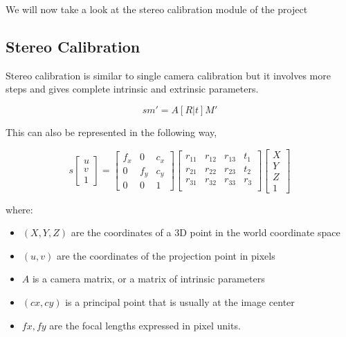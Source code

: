 \documentclass[11pt]{report}
\begin{document}
We will now take a look at the stereo calibration module of the project
\newpage
\subsection{Stereo Calibration}
Stereo calibration is similar to single camera calibration but it involves more steps and gives complete intrinsic and extrinsic parameters. 

\begin{equation}
sm' = A[R|t]M'
\end{equation}

This can also be represented in the following way,

\begin{equation}
s\begin{bmatrix}
u \\ v \\1
\end{bmatrix}
=\begin{bmatrix}
f_x & 0 & c_x\\
0 & f_y & c_y\\
0 & 0 & 1
\end{bmatrix}
\begin{bmatrix}
r_{11} & r_{12} & r_{13} & t_1\\
r_{21} & r_{22} & r_{23} & t_2\\
r_{31} & r_{32} & r_{33} & r_3\\

\end{bmatrix}
\begin{bmatrix}
X \\ Y \\ Z \\ 1
\end{bmatrix}
\end{equation}

where:
\begin{itemize}



  \item      $(X, Y, Z)$ are the coordinates of a 3D point in the world coordinate space
  \item      $(u, v)$ are the coordinates of the projection point in pixels
  \item      $A$ is a camera matrix, or a matrix of intrinsic parameters
  \item      $(cx, cy)$ is a principal point that is usually at the image center
  \item      $fx, fy$ are the focal lengths expressed in pixel units.

\end{itemize}
\end{document}
